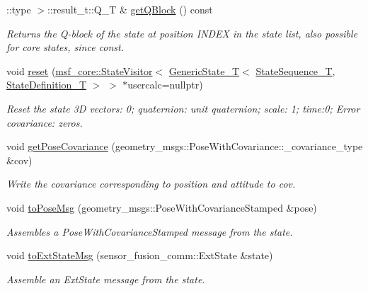 \begin{DoxyCompactItemize}
\-::type $>$\-::result\-\_\-t\-::\-Q\-\_\-\-T \& \hyperlink{structmsf__core_1_1GenericState__T_adde836b510073015d9ec54ed6b2bf971}{get\-Q\-Block} () const 
\begin{DoxyCompactList}\small\item\em Returns the Q-\/block of the state at position I\-N\-D\-E\-X in the state list, also possible for core states, since const. \end{DoxyCompactList}\item 
void \hyperlink{structmsf__core_1_1GenericState__T_aff789c110efbe85318a6455adeb46497}{reset} (\hyperlink{classmsf__core_1_1StateVisitor}{msf\-\_\-core\-::\-State\-Visitor}$<$ \hyperlink{structmsf__core_1_1GenericState__T}{Generic\-State\-\_\-\-T}$<$ \hyperlink{structmsf__core_1_1GenericState__T_a75fe70f7c7517dbf7d4c91b75b08a1dd}{State\-Sequence\-\_\-\-T}, \hyperlink{structmsf__core_1_1GenericState__T_a9a7d65b0325658ab07b81960a3ed4604}{State\-Definition\-\_\-\-T} $>$ $>$ $\ast$usercalc=nullptr)
\begin{DoxyCompactList}\small\item\em Reset the state 3\-D vectors\-: 0; quaternion\-: unit quaternion; scale\-: 1; time\-:0; Error covariance\-: zeros. \end{DoxyCompactList}\item 
void \hyperlink{structmsf__core_1_1GenericState__T_ac83be2ba4d55a9099b067f7e462a9ec7}{get\-Pose\-Covariance} (geometry\-\_\-msgs\-::\-Pose\-With\-Covariance\-::\-\_\-covariance\-\_\-type \&cov)
\begin{DoxyCompactList}\small\item\em Write the covariance corresponding to position and attitude to cov. \end{DoxyCompactList}\item 
void \hyperlink{structmsf__core_1_1GenericState__T_ad30ecf639ff4c96fd689412c5be91d6a}{to\-Pose\-Msg} (geometry\-\_\-msgs\-::\-Pose\-With\-Covariance\-Stamped \&pose)
\begin{DoxyCompactList}\small\item\em Assembles a Pose\-With\-Covariance\-Stamped message from the state. \end{DoxyCompactList}\item 
void \hyperlink{structmsf__core_1_1GenericState__T_aa94d1ef9bf4f2d3aea2d1cc9c6c04f50}{to\-Ext\-State\-Msg} (sensor\-\_\-fusion\-\_\-comm\-::\-Ext\-State \&state)
\begin{DoxyCompactList}\small\item\em Assemble an Ext\-State message from the state. \end{DoxyCompactList}\item 

\end{DoxyCompactItemize}
